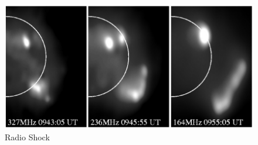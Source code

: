 \begin{figure}
\begin{center}
\includegraphics[trim=1cm 0cm 0cm 0cm, scale=0.4]{images/radio_shock.png}
\caption{Radio Shock}
\end{center}
\label{fig:maia}
\end{figure}

